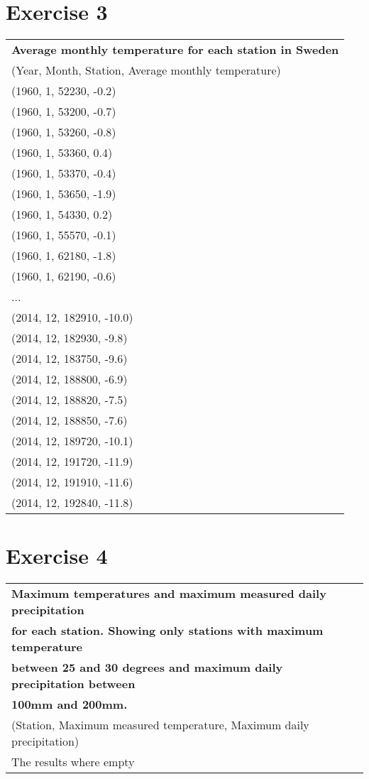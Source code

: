 \documentclass[a4paper,titlepage,12pt]{article}
\begin{document}
\section{Exercise 3}
\begin{tabular}{l}
  \bf Average monthly temperature for each station in Sweden \\ 
  (Year, Month, Station, Average monthly temperature) \\
  \hline
  (1960, 1, 52230, -0.2) \\ 
  (1960, 1, 53200, -0.7) \\ 
  (1960, 1, 53260, -0.8) \\
  (1960, 1, 53360, 0.4)  \\
  (1960, 1, 53370, -0.4) \\
  (1960, 1, 53650, -1.9) \\
  (1960, 1, 54330, 0.2)  \\
  (1960, 1, 55570, -0.1) \\
  (1960, 1, 62180, -1.8) \\
  (1960, 1, 62190, -0.6) \\
  ... \\
  (2014, 12, 182910, -10.0) \\
  (2014, 12, 182930, -9.8)  \\
  (2014, 12, 183750, -9.6)  \\
  (2014, 12, 188800, -6.9)  \\
  (2014, 12, 188820, -7.5)  \\
  (2014, 12, 188850, -7.6)  \\
  (2014, 12, 189720, -10.1) \\
  (2014, 12, 191720, -11.9) \\
  (2014, 12, 191910, -11.6) \\
  (2014, 12, 192840, -11.8) \\
\end{tabular}

\section{Exercise 4}
\begin{tabular}{l}
  \bf Maximum temperatures and maximum measured daily precipitation \\
  \bf for each station. Showing only stations with maximum temperature \\
  \bf between 25 and 30 degrees and maximum daily precipitation between \\
  \bf 100mm and 200mm. \\
  (Station, Maximum measured temperature, Maximum daily precipitation) \\
  \hline
  The results where empty \\ 
\end{tabular}
\end{document}
